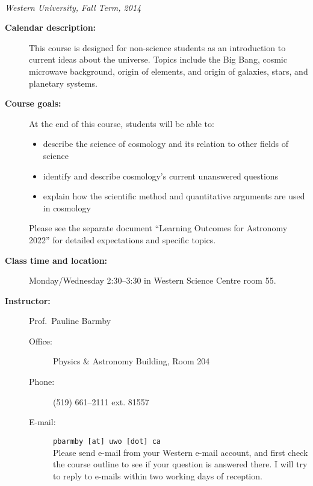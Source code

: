 \documentclass[12pt]{article}
\begin{document}
\thispagestyle{empty}

\begin{center}
\\
\vspace{0.1in}
{\it Western University, Fall Term, 2014}
\end{center}

\vspace{0.0in}

\begin{description}

\item[\bf Calendar description:] This course is designed for non-science students as an introduction to current ideas about the universe. Topics include the Big Bang, cosmic microwave background, origin of elements, and origin of galaxies, stars, and planetary systems.

\item[\bf Course goals:] \hspace{1cm}   

At the end of this course, students will be able to:
\begin{itemize}
\item describe the science of cosmology and its relation to other fields of science
\item identify and describe cosmology's current unanswered questions 
\item explain how the scientific method and quantitative arguments are used in cosmology 
\end{itemize}
Please see the separate document ``Learning Outcomes for Astronomy 2022'' for 
detailed expectations and specific topics. 

\item[\bf Class time and location:] Monday/Wednesday 2:30--3:30 in Western Science Centre room 55.

\item[\bf Instructor:]  Prof.\ Pauline Barmby 
 \begin{description}

   \item[Office:] Physics \& Astronomy Building, Room  204 

   \item[Phone:] (519) 661--2111 ext.   81557 

   \item[E-mail:]  \verb$pbarmby [at] uwo [dot] ca $\\
   Please send e-mail from your Western e-mail account, and first check the course outline to see if your question is answered there. 
   I will try to reply to e-mails within two working days of reception. 
   

\end{description}
\end{description}
\end{document}
